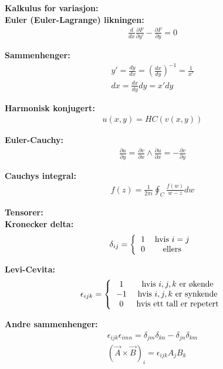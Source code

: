 \documentclass[8pt, A4paper, norsk]{extarticle}
\begin{document}
\begin{multicols*}{3}
{\Large \textbf{Kalkulus for variasjon:}} \\
\textbf{Euler (Euler-Lagrange) likningen:}
		\begin{gather*}
\frac{d}{dx} \frac{\partial F}{\partial y'} - \frac{\partial F}{\partial y} = 0
		\end{gather*}

\textbf{Sammenhenger:}
		\begin{gather*}
y' = \frac{dy}{dx} = \left( \frac{dx}{dy} \right)^{-1} = \frac{1}{x'} \\
dx = \frac{dx}{dy} dy = x' dy
		\end{gather*}


{\Large \textbf{Harmonisk konjugert:}}
		\begin{gather*}
u(x, y) = HC(v(x, y))
		\end{gather*}

\textbf{Euler-Cauchy:}
		 \begin{gather*}
\frac{\partial u}{\partial y} = \frac{\partial v}{\partial x} \wedge \frac{\partial u}{\partial x} = - \frac{\partial v}{\partial y}
		\end{gather*}


{\Large \textbf{Cauchys integral:}}
		\begin{gather*}
f(z) = \frac{1}{2 \pi i} \oint_C \frac{f(w)}{w - z} dw
		\end{gather*}


{\Large \textbf{Tensorer:}} \\
\textbf{Kronecker delta:}
		\begin{gather*}
\delta_{ij} = \left\{
\begin{tabular}{ cc }
$1$ & hvis $i = j$ \\
$0$ & ellers
\end{tabular} 
\right.
		\end{gather*}

\textbf{Levi-Cevita:}
		\begin{gather*}
\epsilon_{ijk} = \left\{ 
\begin{tabular}{ cc }
$1$ & hvis $i,j,k$ er økende \\
$-1$ & hvis $i,j,k$ er synkende \\
$0$ & hvis ett tall er repetert
\end{tabular} 
\right.
		\end{gather*}

\textbf{Andre sammenhenger:}
		\begin{gather*}
\epsilon_{ijk} \epsilon_{imn} = \delta_{jm} \delta_{kn} - \delta_{jn} \delta_{km} \\
(\vec{A} \times \vec{B})_{i} = \epsilon_{ijk} A_{j} B_{k}
		\end{gather*}



\end{multicols*}
\end{document}

